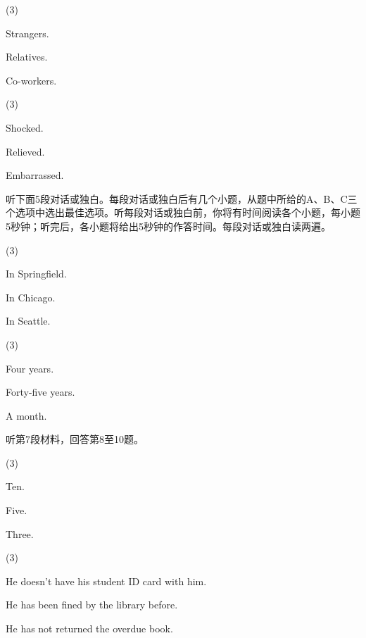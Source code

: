 \documentclass{英语试卷}
\begin{document}
\begin{choices}(3)
  \item Strangers.
  \item Relatives.
  \item Co-workers.
\end{choices}
\begin{choices}(3)
  \item Shocked.
  \item Relieved.
  \item Embarrassed.
\end{choices}
\par 听下面5段对话或独白。每段对话或独白后有几个小题，从题中所给的A、B、C三个选项中选出最佳选项。听每段对话或独白前，你将有时间阅读各个小题，每小题5秒钟；听完后，各小题将给出5秒钟的作答时间。每段对话或独白读两遍。\par
{}
\begin{choices}(3)
  \item In Springfield.
  \item In Chicago.
  \item In Seattle.
\end{choices}
\begin{choices}(3)
  \item Four years.
  \item Forty-five years.
  \item A month.
\end{choices}
\par 听第7段材料，回答第8至10题。\par
{}
\begin{choices}(3)
  \item Ten.
  \item Five.
  \item Three.
\end{choices}
\begin{choices}(3)
  \item He doesn't have his student ID card with him.
  \item He has been fined by the library before.
  \item He has not returned the overdue book.
\end{choices}
\end{document}
